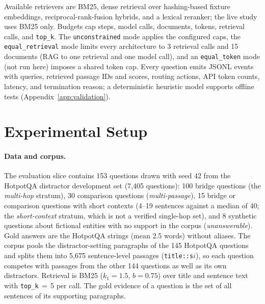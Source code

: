 \documentclass[11pt,a4paper]{article}
\begin{document}
Available retrievers are BM25, dense retrieval over hashing-based fixture
embeddings, reciprocal-rank-fusion hybrids, and a lexical reranker; the live
study uses BM25 only.
Budgets cap steps, model calls, documents, tokens, retrieval calls, and
\texttt{top\_k}.
The \texttt{unconstrained} mode applies the configured caps, the
\texttt{equal\_retrieval} mode limits every architecture to 3 retrieval calls
and 15 documents (RAG to one retrieval and one model call), and an
\texttt{equal\_token} mode (not run here) imposes a shared token cap.
Every question emits JSONL events with queries, retrieved passage IDs and
scores, routing actions, API token counts, latency, and termination reason; a
deterministic heuristic model supports offline tests
(Appendix~\ref{app:validation}).

\section{Experimental Setup}
\label{sec:setup}

\paragraph{Data and corpus.}
The evaluation slice contains 153 questions drawn with seed 42 from the
HotpotQA distractor development set (7{,}405 questions): 100 bridge
questions (the \emph{multi-hop} stratum), 30 comparison questions
(\emph{multi-passage}), 15 bridge or comparison questions with short contexts
(4--19 sentences against a median of 40; the \emph{short-context} stratum,
which is not a verified single-hop set), and 8 synthetic questions about
fictional entities with no support in the corpus (\emph{unanswerable}).
Gold answers are the HotpotQA strings (mean 2.5 words) without aliases.
The corpus pools the distractor-setting paragraphs of the 145 HotpotQA
questions and splits them into 5{,}675 sentence-level passages
(\texttt{title::s$i$}), so each question competes with passages from the
other 144 questions as well as its own distractors.
Retrieval is BM25 ($k_1{=}1.5$, $b{=}0.75$) over title and sentence text with
\texttt{top\_k}\,$=$\,5 per call.
The gold evidence of a question is the set of all sentences of its supporting
paragraphs.
\end{document}
